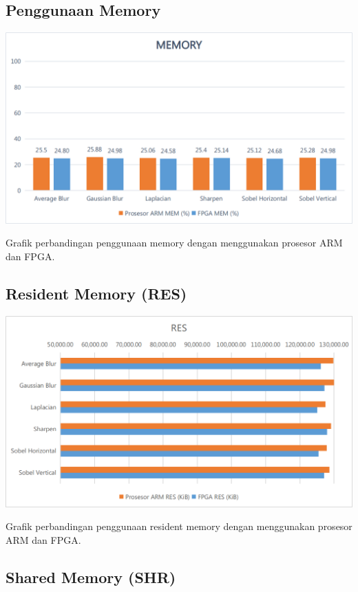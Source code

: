 \subsection{Penggunaan Memory}
\blindtext

\begin{afigure}
    \includegraphics[width=0.9\linewidth, center]{images/chart/chart-mem.png}
    \caption{Grafik perbandingan penggunaan memory dengan menggunakan prosesor ARM dan FPGA.}
    \label{fig:chart-mem}
\end{afigure}

\subsection{Resident Memory (RES)}
\blindtext

\begin{afigure}
    \includegraphics[width=0.9\linewidth, center]{images/chart/chart-res.png}
    \caption{Grafik perbandingan penggunaan resident memory dengan menggunakan prosesor ARM dan FPGA.}
    \label{fig:chart-res}
\end{afigure}

\subsection{Shared Memory (SHR)}
\blindtext

